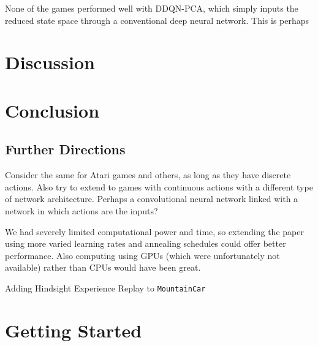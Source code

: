 \documentclass[11pt]{article}
\newcommand{\mc}{\texttt{MountainCar}}
\begin{document}
None of the games performed well with DDQN-PCA, which simply inputs the reduced state space through a conventional deep neural network. This is perhaps 


\section{Discussion}

\section{Conclusion}

\subsection{Further Directions}

Consider the same for Atari games and others, as long as they have discrete actions. Also try to extend to games with continuous actions with a different type of network architecture. Perhaps a convolutional neural network linked with a network in which actions are the inputs?

We had severely limited computational power and time, so extending the paper using more varied learning rates and annealing schedules could offer better performance. Also computing using GPUs (which were unfortunately not available) rather than CPUs would have been great.

Adding Hindsight Experience Replay to \mc

\newpage
{}


\newpage

\appendix

\section{Getting Started}
\label{app:getting_started}
\end{document}
